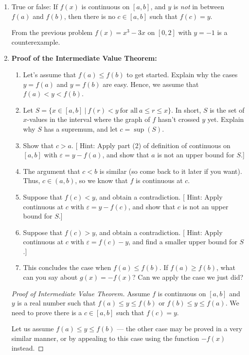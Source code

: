 \documentclass[12pt]{amsart}
\def\e{\varepsilon}
\numberwithin{equation}{section}
\theoremstyle{plain} %
\theoremstyle{definition}
\theoremstyle{remark}
\begin{document}
\begin{enumerate}
\item True or false: If $f(x)$ is continuous on $[a,b]$, and $y$ is \emph{not} in between $f(a)$ and $f(b)$, then there is no $c\in[a,b]$ such that $f(c) = y$.

\begin{framed}
From the previous problem $f(x)=x^3-3x$ on $[0,2]$ with $y=-1$ is a counterexample.
\end{framed}

\item \textbf{Proof of the Intermediate Value Theorem:}
\begin{enumerate}
\item Let's assume that $f(a) \leq f(b)$ to get started. Explain why the cases $y=f(a)$ and $y=f(b)$ are easy. Hence, we assume that $f(a)< y < f(b)$.
\item Let $S=\{ x\in [a,b] \ | \ f(r) < y \ \text{for all} \ a\leq r \leq x \}$. In short, $S$ is the set of $x$-values in the interval where the graph of $f$ hasn't crossed $y$ yet. Explain why $S$ has a supremum, and let $c= \sup(S)$.
\item Show that $c >a$. [ Hint: Apply part (2) of definition of continuous on $[a,b]$ with $\e = y-f(a)$, and show that $a$ is not an upper bound for $S$.]
\item The argument that $c<b$ is similar (so come back to it later if you want). Thus, $c\in (a,b)$, so we know that $f$ is continuous at $c$.
\item Suppose that $f(c)<y$, and obtain a contradiction. [ Hint: Apply continuous at $c$ with $\e= y-f(c)$, and show that $c$ is not an upper bound for $S$.]
\item Suppose that $f(c)>y$, and obtain a contradiction. [ Hint: Apply continuous at $c$ with $\e= f(c)-y$, and find a smaller upper bound for $S$.]
\item This concludes the case when $f(a) \leq f(b)$. If $f(a) \geq f(b)$, what can you say about $g(x) = -f(x)$? Can we apply the case we just did?
\end{enumerate}

\begin{framed}

\begin{proof}[Proof of Intermediate Value Theorem] Assume $f$ is continuous on $[a,b]$ and $y$ is a real
  number such that  $f(a) \leq y \leq f(b)$ or $f(b) \leq y \leq f(a)$. We need to prove there is a $c \in [a,b]$ such that $f(c) = y$.

  Let us assume $f(a) \leq y \leq f(b)$ --- the other case may be proved in a very similar manner, or by appealing to this case using the function $-f(x)$ instead.
  

\end{proof}
\end{framed}
\end{enumerate}
\end{document}
